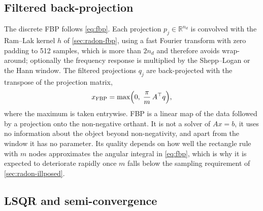 \documentclass[11pt,a4paper]{article}
\numberwithin{equation}{section}
\theoremstyle{remark}
\newcommand{\R}{\mathbb{R}}
\newcommand{\T}{\top}
\begin{document}
\subsection{Filtered back-projection}\label{sec:methods-fbp}

The discrete FBP follows \eqref{eq:fbp}. Each projection $p_j\in\R^{n_d}$ is convolved with the Ram--Lak kernel $h$ of \cref{sec:radon-fbp}, using a fast Fourier transform with zero padding to 512 samples, which is more than $2n_d$ and therefore avoids wrap-around; optionally the frequency response is multiplied by the Shepp--Logan or the Hann window. The filtered projections $q_j$ are back-projected with the transpose of the projection matrix,
\begin{equation}\label{eq:fbp-discrete}
  x_{\mathrm{FBP}}=\max\Bigl(0,\;\frac{\pi}{m}\,A^\T q\Bigr),
\end{equation}
where the maximum is taken entrywise. FBP is a linear map of the data followed by a projection onto the non-negative orthant. It is not a solver of $Ax=b$, it uses no information about the object beyond non-negativity, and apart from the window it has no parameter. Its quality depends on how well the rectangle rule with $m$ nodes approximates the angular integral in \eqref{eq:fbp}, which is why it is expected to deteriorate rapidly once $m$ falls below the sampling requirement of \cref{sec:radon-illposed}.

\subsection{LSQR and semi-convergence}\label{sec:methods-lsqr}
\end{document}
